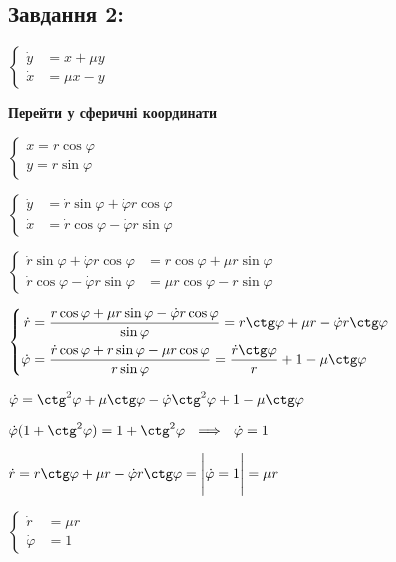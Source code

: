 \subsection{Завдання 2:}
$\left\{\begin{aligned}
    \dot{y} &= x + \mu y \\
    \dot{x} &= \mu x - y
\end{aligned}\right.$

\textbf{Перейти у сферичні координати}

$\left\{\begin{aligned}
    x = r\cos \varphi\\
    y = r\sin \varphi
\end{aligned}\right.$

$\left\{\begin{aligned}
    \dot{y} &= \dot{r}\sin \varphi + \dot{\varphi}r \cos \varphi \\
    \dot{x} &= \dot{r}\cos \varphi - \dot{\varphi} r \sin \varphi
\end{aligned}\right.$



$\left\{\begin{aligned}
    \dot{r}\sin \varphi + \dot{\varphi}r \cos \varphi &=  r\cos \varphi + \mu r \sin \varphi\\
    \dot{r}\cos \varphi - \dot{\varphi} r \sin \varphi &= \mu r \cos \varphi - r \sin \varphi
\end{aligned}\right.$

$\left\{\begin{aligned}
    \dot{r} &= \frac{r\cos \varphi + \mu r \sin \varphi -\dot{\varphi}r \cos \varphi}{ \sin\varphi} = 
    r\ctg\varphi + \mu r - \dot{\varphi}r\ctg \varphi\\
    \dot{\varphi} &= \frac{\dot{r}\cos \varphi + r \sin \varphi - \mu r \cos \varphi}{r \sin \varphi} = 
    \frac{\dot{r}\ctg \varphi}{r} + 1 - \mu \ctg \varphi
\end{aligned}\right.$

$\dot{\varphi} = \ctg^2\varphi + \mu \ctg\varphi - \dot{\varphi}\ctg^2 \varphi +1 - \mu \ctg \varphi$

$\dot{\varphi} (1 + \ctg^2 \varphi)= 1 + \ctg^2 \varphi \ \ \Longrightarrow \ \ \dot{\varphi} = 1$

$\dot{r} = r\ctg\varphi + \mu r - \dot{\varphi}r\ctg \varphi = \Bigg| \dot{\varphi} = 1 \Bigg| = \mu r$

$\left\{\begin{aligned}
    \dot{r} &= \mu r\\
    \dot{\varphi} &= 1
\end{aligned}\right.$

